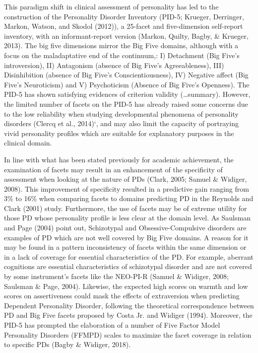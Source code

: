 \documentclass[,man,floatsintext]{apa6}
\theoremstyle{definition}
\theoremstyle{definition}
\theoremstyle{definition}
\theoremstyle{remark}
\begin{document}
This paradigm shift in clinical assessment of personality has led to the
construction of the Personality Disorder Inventory (PID-5; Krueger,
Derringer, Markon, Watson, and Skodol (2012)), a 25-facet and
five-dimension self-report inventory, with an informant-report version
(Markon, Quilty, Bagby, \& Krueger, 2013). The big five dimensions
mirror the Big Five domains, although with a focus on the maladaptative
end of the continuum,: I) Detachment (Big Five's introversion), II)
Antagonism (absence of Big Five's Agreeableness), III) Disinhibition
(absence of Big Five's Conscientiousness), IV) Negative affect (Big
Five's Neuroticism) and V) Psychoticism (Absence of Big Five's
Openness). The PID-5 has shown satisfying evidences of criterion
validity (\ldots{}summary). However, the limited number of facets on the
PID-5 has already raised some concerns due to the low reliability when
studying developmental phenomena of personality disorders (Clercq et
al., 2014)`, and may also limit the capacity of portraying vivid
personality profiles which are suitable for explanatory purposes in the
clinical domain.

In line with what has been stated previously for academic achievement,
the examination of facets may result in an enhancement of the
specificity of assessment when looking at the nature of PDs (Clark,
2005; Samuel \& Widiger, 2008). This improvement of specificity resulted
in a predictive gain ranging from 3\% to 16\% when comparing facets to
domains predicting PD in the Reynolds and Clark (2001) study.
Furthermore, the use of facets may be of extreme utility for those PD
whose personality profile is less clear at the domain level. As Saulsman
and Page (2004) point out, Schizotypal and Obsessive-Compulsive
disorders are examples of PD which are not well covered by Big Five
domains. A reason for it may be found in a pattern inconsistency of
facets within the same dimension or in a lack of coverage for essential
characteristics of the PD. For example, aberrant cognitions are
essential characteristics of schizotypal disorder and are not covered by
some instrument's facets like the NEO-PI-R (Samuel \& Widiger, 2008;
Saulsman \& Page, 2004). Likewise, the expected high scores on warmth
and low scores on assertiveness could mask the effects of extraversion
when predicting Dependent Personality Disorder, following the
theoretical correspondence between PD and Big Five facets proposed by
Costa Jr. and Widiger (1994). Moreover, the PID-5 has prompted the
elaboration of a number of Five Factor Model Personality Disorders
(FFMPD) scales to maximize the facet coverage in relation to specific
PDs (Bagby \& Widiger, 2018).
\end{document}
